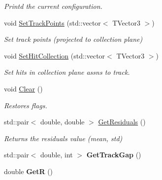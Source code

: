 \begin{DoxyCompactItemize}
\begin{DoxyCompactList}\small\item\em Printd the current configuration. \end{DoxyCompactList}\item 
\hypertarget{classubana_1_1TrackQuality_a082ceeef0c8dacf7ed1a0f3011ed6675}{void \hyperlink{classubana_1_1TrackQuality_a082ceeef0c8dacf7ed1a0f3011ed6675}{Set\-Track\-Points} (std\-::vector$<$ T\-Vector3 $>$)}\label{classubana_1_1TrackQuality_a082ceeef0c8dacf7ed1a0f3011ed6675}

\begin{DoxyCompactList}\small\item\em Set track points (projected to collection plane) \end{DoxyCompactList}\item 
\hypertarget{classubana_1_1TrackQuality_aec2fa3a1e167aab0434cbd214b54d999}{void \hyperlink{classubana_1_1TrackQuality_aec2fa3a1e167aab0434cbd214b54d999}{Set\-Hit\-Collection} (std\-::vector$<$ T\-Vector3 $>$)}\label{classubana_1_1TrackQuality_aec2fa3a1e167aab0434cbd214b54d999}

\begin{DoxyCompactList}\small\item\em Set hits in collection plane assns to track. \end{DoxyCompactList}\item 
\hypertarget{classubana_1_1TrackQuality_adfa289c8c8863cb916399d03e12f0a8d}{void \hyperlink{classubana_1_1TrackQuality_adfa289c8c8863cb916399d03e12f0a8d}{Clear} ()}\label{classubana_1_1TrackQuality_adfa289c8c8863cb916399d03e12f0a8d}

\begin{DoxyCompactList}\small\item\em Restores flags. \end{DoxyCompactList}\item 
\hypertarget{classubana_1_1TrackQuality_a4f0ec2ee0c8960d35b56ccdf11c77a8e}{std\-::pair$<$ double, double $>$ \hyperlink{classubana_1_1TrackQuality_a4f0ec2ee0c8960d35b56ccdf11c77a8e}{Get\-Residuals} ()}\label{classubana_1_1TrackQuality_a4f0ec2ee0c8960d35b56ccdf11c77a8e}

\begin{DoxyCompactList}\small\item\em Returns the residuals value (mean, std) \end{DoxyCompactList}\item 
\hypertarget{classubana_1_1TrackQuality_a9b49aa65c3b139e8445ee6f2f0ea7d84}{std\-::pair$<$ double, int $>$ {\bfseries Get\-Track\-Gap} ()}\label{classubana_1_1TrackQuality_a9b49aa65c3b139e8445ee6f2f0ea7d84}

\item 
\hypertarget{classubana_1_1TrackQuality_a11375fbd08fd9f313de50aaf18aecc65}{double {\bfseries Get\-R} ()}\label{classubana_1_1TrackQuality_a11375fbd08fd9f313de50aaf18aecc65}

\end{DoxyCompactItemize}
